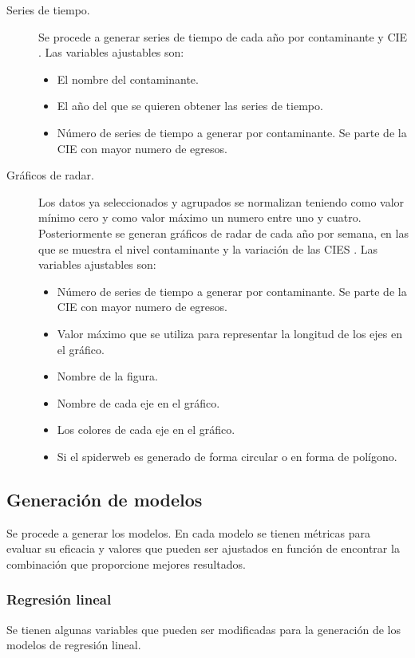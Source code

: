 \begin{description}
\item [Series de tiempo.] {Se procede a generar series de tiempo de cada año por contaminante y CIE \citep{r9}}. Las variables ajustables son:
\begin{itemize}
	\item El nombre del contaminante.
	\item El año del que se quieren obtener las series de tiempo.
	\item Número de series de tiempo a generar por contaminante. Se parte de la CIE \citep{r9} con mayor numero de egresos.
\end{itemize}

\item [Gráficos de radar.] {Los datos ya seleccionados y agrupados se normalizan teniendo como valor mínimo cero y como valor máximo un numero entre uno y cuatro. Posteriormente se generan gráficos de radar de cada año por semana, en las que se muestra el nivel contaminante y la variación de las CIES \citep{r9}}. Las variables ajustables son:
\begin{itemize}
    \item Número de series de tiempo a generar por contaminante. Se parte de la CIE \citep{r9} con mayor numero de egresos.
	\item Valor máximo que se utiliza para representar la longitud de los ejes en el gráfico.
	\item Nombre de la figura.
	\item Nombre de cada eje en el gráfico.
	\item Los colores de cada eje en el gráfico. 
	\item Si el spiderweb es generado de forma circular o en forma de polígono.
\end{itemize}
\end{description}

\subsection{Generación de modelos}
Se procede a generar los modelos. En cada modelo se tienen métricas para evaluar su eficacia y valores que pueden ser ajustados en función de encontrar la combinación que proporcione mejores resultados.

\subsubsection{Regresión lineal}
Se tienen algunas variables que pueden ser modificadas para la generación de los modelos de regresión lineal.

